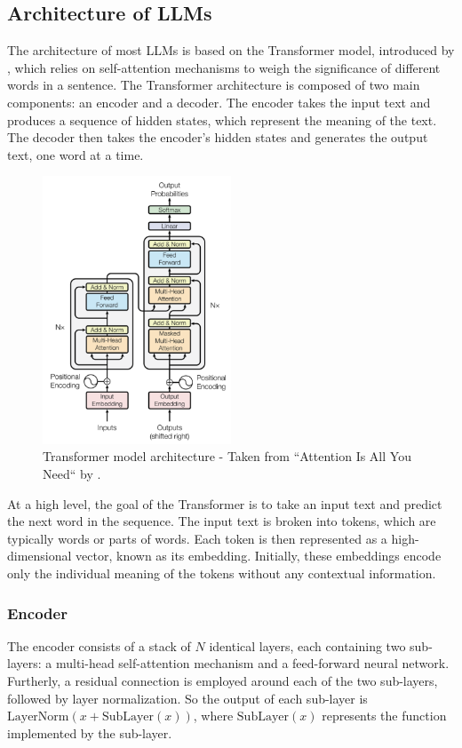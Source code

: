         \subsection{Architecture of LLMs}
        The architecture of most LLMs is based on the Transformer model, introduced by \cite{vaswani2023attention}, which relies on self-attention mechanisms to weigh the significance of different words in a sentence. The Transformer architecture is composed of two main components: an encoder and a decoder. The encoder takes the input text and produces a sequence of hidden states, which represent the meaning of the text. The decoder then takes the encoder's hidden states and generates the output text, one word at a time.
            \begin{figure}[h!]
                \centering
                \includegraphics[width=0.5\textwidth]{figs/transform_model.png}
                \caption{Transformer model architecture - Taken from “Attention Is All You Need“ by \cite{vaswani2023attention}.}
            \end{figure}

            At a high level, the goal of the Transformer is to take an input text and predict the next word in the sequence. The input text is broken into tokens, which are typically words or parts of words. Each token is then represented as a high-dimensional vector, known as its embedding. Initially, these embeddings encode only the individual meaning of the tokens without any contextual information.

            \subsubsection{Encoder}
            The encoder consists of a stack of \(N\) identical layers, each containing two sub-layers: a multi-head self-attention mechanism and a feed-forward neural network. Furtherly, a residual connection is employed around each of the two sub-layers, followed by layer normalization. So the output of each sub-layer is \(\text{LayerNorm}(x + \text{SubLayer} (x))\), where \(\text{SubLayer}(x)\) represents the function implemented by the sub-layer.
            
